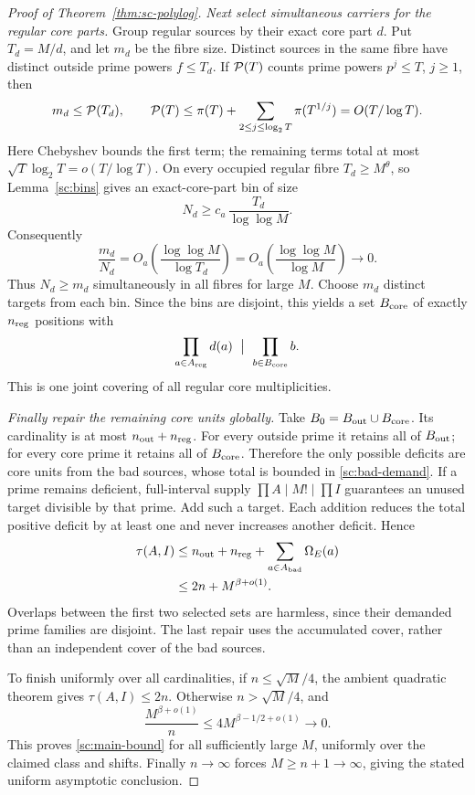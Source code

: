 \begin{proof}[Proof of Theorem~\ref{thm:sc-polylog}]
\emph{Next select simultaneous carriers for the regular core parts.}
Group regular sources by their exact core part \(d\). Put
\(T_d=M/d\), and let \(m_d\) be the fibre size.
Distinct sources in the same fibre have distinct outside prime
powers \(f\le T_d\). If \({\cal P}(T)\) counts prime powers
\(p^j\le T\), \(j\ge1\), then
\[
 m_d\le{\cal P}(T_d),\qquad
 {\cal P}(T)\le\pi(T)+
       \sum_{2\le j\le\log_2T}\pi(T^{1/j})
 =O(T/\log T).
\]
Here Chebyshev bounds the first term; the remaining terms total
at most \(\sqrt T\log_2T=o(T/\log T)\).
On every occupied regular fibre \(T_d\ge M^\theta\), so
Lemma~\ref{sc:bins} gives an exact-core-part bin of size
\[
 N_d\ge c_a\,\frac{T_d}{\log\log M}.
\]
Consequently
\[
 \frac{m_d}{N_d}
 =O_a\!\left(\frac{\log\log M}{\log T_d}\right)
 =O_a\!\left(\frac{\log\log M}{\log M}\right)\longrightarrow0.
\]
Thus \(N_d\ge m_d\) simultaneously in all fibres for large
\(M\). Choose \(m_d\) distinct targets from each bin. Since the
bins are disjoint, this yields a set \(B_{\rm core}\) of exactly
\(n_{\rm reg}\) positions with
\begin{equation}
 \prod_{a\in A_{\rm reg}}d(a)\ \bigm|\ \prod_{b\in B_{\rm core}}b.
 \label{sc:core-carriers}
\end{equation}
This is one joint covering of all regular core multiplicities.

\emph{Finally repair the remaining core units globally.}
Take \(B_0=B_{\rm out}\cup B_{\rm core}\). Its cardinality is
at most \(n_{\rm out}+n_{\rm reg}\).
For every outside prime it retains all of \(B_{\rm out}\);
for every core prime it retains all of \(B_{\rm core}\).
Therefore the only possible deficits are core units from the
bad sources, whose total is bounded in \eqref{sc:bad-demand}.
If a prime remains deficient, full-interval supply
\(\prod A\mid M!\mid\prod I\) guarantees an unused target
divisible by that prime. Add such a target. Each addition reduces
the total positive deficit by at least one and never increases
another deficit. Hence
\begin{equation}
 \begin{split}
 \tau(A,I)
 &\le n_{\rm out}+n_{\rm reg}
                 +\sum_{a\in A_{\rm bad}}\Omega_E(a)\\
 &\le2n+M^{\beta+o(1)}.
 \end{split}
 \label{sc:constructive-bound}
\end{equation}
Overlaps between the first two selected sets are harmless, since
their demanded prime families are disjoint. The last repair uses
the accumulated cover, rather than an independent cover of the
bad sources.

To finish uniformly over all cardinalities, if \(n\le\sqrt M/4\),
the ambient quadratic theorem \cite[Appendix A]{Wang} gives
\(\tau(A,I)\le2n\). Otherwise \(n>\sqrt M/4\), and
\[
 \frac{M^{\beta+o(1)}}n
 \le4M^{\beta-1/2+o(1)}\longrightarrow0.
\]
This proves \eqref{sc:main-bound} for all sufficiently large
\(M\), uniformly over the claimed class and shifts.
Finally \(n\to\infty\) forces \(M\ge n+1\to\infty\),
giving the stated uniform asymptotic conclusion.
\end{proof}

